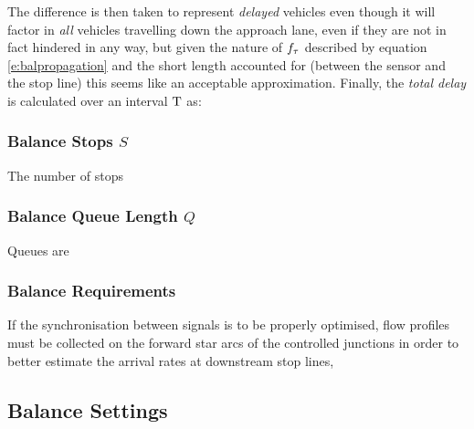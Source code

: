 The difference is then taken to represent \emph{delayed} vehicles even though it will factor in \emph{all} vehicles travelling down the approach lane, even if they are not in fact hindered in any way, but given the nature of $f_{\tau}$ described by equation \eqref{e:balpropagation} and the short length accounted for (between the sensor and the stop line) this seems like an acceptable approximation. Finally, the \emph{total delay} is calculated over an interval $\mathrm{T}$ as:

\subsubsection*{Balance Stops $S$}
The number of stops

\subsubsection*{Balance Queue Length $Q$}
Queues are

\subsubsection{Balance Requirements} \label{s:balreq}

If the synchronisation between signals is to be properly optimised, flow profiles must be collected on the forward star arcs of the controlled junctions in order to better estimate the arrival rates at downstream stop lines, 


\subsection{Balance Settings} \label{s:balset}


